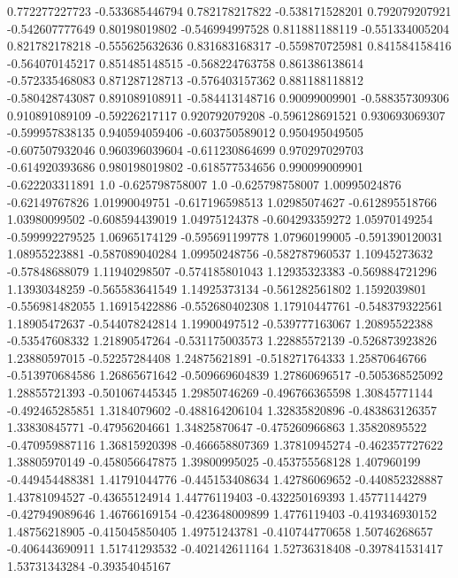  0.772277227723  -0.533685446794
 0.782178217822  -0.538171528201
 0.792079207921  -0.542607777649
  0.80198019802  -0.546994997528
 0.811881188119  -0.551334005204
 0.821782178218  -0.555625632636
 0.831683168317  -0.559870725981
 0.841584158416  -0.564070145217
 0.851485148515  -0.568224763758
 0.861386138614  -0.572335468083
 0.871287128713  -0.576403157362
 0.881188118812  -0.580428743087
 0.891089108911  -0.584413148716
  0.90099009901  -0.588357309306
 0.910891089109   -0.59226217117
 0.920792079208  -0.596128691521
 0.930693069307  -0.599957838135
 0.940594059406  -0.603750589012
 0.950495049505  -0.607507932046
 0.960396039604  -0.611230864699
 0.970297029703  -0.614920393686
 0.980198019802  -0.618577534656
 0.990099009901  -0.622203311891
            1.0  -0.625798758007
            1.0  -0.625798758007
  1.00995024876   -0.62149767826
  1.01990049751  -0.617196598513
  1.02985074627  -0.612895518766
  1.03980099502  -0.608594439019
  1.04975124378  -0.604293359272
  1.05970149254  -0.599992279525
  1.06965174129  -0.595691199778
  1.07960199005  -0.591390120031
  1.08955223881  -0.587089040284
  1.09950248756  -0.582787960537
  1.10945273632   -0.57848688079
  1.11940298507  -0.574185801043
  1.12935323383  -0.569884721296
  1.13930348259  -0.565583641549
  1.14925373134  -0.561282561802
   1.1592039801  -0.556981482055
  1.16915422886  -0.552680402308
  1.17910447761  -0.548379322561
  1.18905472637  -0.544078242814
  1.19900497512  -0.539777163067
  1.20895522388   -0.53547608332
  1.21890547264  -0.531175003573
  1.22885572139  -0.526873923826
  1.23880597015   -0.52257284408
  1.24875621891  -0.518271764333
  1.25870646766  -0.513970684586
  1.26865671642  -0.509669604839
  1.27860696517  -0.505368525092
  1.28855721393  -0.501067445345
  1.29850746269  -0.496766365598
  1.30845771144  -0.492465285851
   1.3184079602  -0.488164206104
  1.32835820896  -0.483863126357
  1.33830845771   -0.47956204661
  1.34825870647  -0.475260966863
  1.35820895522  -0.470959887116
  1.36815920398  -0.466658807369
  1.37810945274  -0.462357727622
  1.38805970149  -0.458056647875
  1.39800995025  -0.453755568128
    1.407960199  -0.449454488381
  1.41791044776  -0.445153408634
  1.42786069652  -0.440852328887
  1.43781094527   -0.43655124914
  1.44776119403  -0.432250169393
  1.45771144279  -0.427949089646
  1.46766169154  -0.423648009899
   1.4776119403  -0.419346930152
  1.48756218905  -0.415045850405
  1.49751243781  -0.410744770658
  1.50746268657  -0.406443690911
  1.51741293532  -0.402142611164
  1.52736318408  -0.397841531417
  1.53731343284   -0.39354045167
